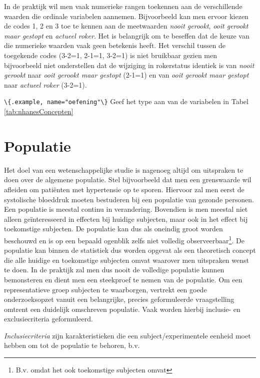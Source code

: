 \documentclass[
  12pt,dutch,coursenotes]{book}
\newcommand{\passthrough}[1]{#1}
\begin{document}
In de praktijk wil men vaak numerieke rangen toekennen aan de verschillende
waarden die ordinale variabelen aannemen. Bijvoorbeeld kan men ervoor kiezen
de codes 1, 2 en 3 toe te kennen aan de meetwaarden \emph{nooit gerookt}, \emph{ooit gerookt maar gestopt} en \emph{actueel roker}.
Het is belangrijk om te beseffen dat de keuze van die numerieke waarden vaak geen betekenis heeft.
Het verschil tussen de toegekende codes (3-2=1, 2-1=1, 3-2=1) is niet bruikbaar gezien men bijvoorbeeld niet onderstellen dat de wijziging in rokerstatus identiek is van \emph{nooit gerookt} naar \emph{ooit gerookt maar gestopt} (2-1=1) en van \emph{ooit gerookt maar gestopt} naar \emph{actueel roker} (3-2=1).

\passthrough{\lstinline!\{.example, name="oefening"\}!}
Geef het type aan van de variabelen in Tabel \ref{tab:nhanesConcepten}

\hypertarget{subsec:pop}{%
\section{Populatie}\label{subsec:pop}}

Het doel van een wetenschappelijke studie is nagenoeg altijd om uitspraken te doen over de algemene populatie.
Stel bijvoorbeeld dat men een grenswaarde wil afleiden om patiënten met hypertensie op te sporen.
Hiervoor zal men eerst de systolische bloeddruk moeten bestuderen bij een populatie van gezonde personen.
Een populatie is meestal continu in verandering.
Bovendien is men meestal niet alleen geïnteresseerd in effecten bij huidige subjecten, maar ook in het effect bij toekomstige subjecten.
De populatie kan dus als oneindig groot worden beschouwd en is op een bepaald ogenblik zelfs niet volledig observeerbaar\footnote{B.v. omdat het ook toekomstige subjecten omvat}.
De populatie kan binnen de statistiek dus worden opgevat als een theoretisch concept die alle huidige en toekomstige subjecten omvat waarover men uitspraken wenst te doen.
In de praktijk zal men dus nooit de volledige populatie kunnen bemonsteren en dient men een steekproef te nemen van de populatie.
Om een representatieve groep subjecten te waarborgen, vertrekt een goede onderzoeksopzet vanuit een belangrijke, precies geformuleerde vraagstelling
omtrent een duidelijk omschreven populatie.
Vaak worden hierbij inclusie- en exclusiecriteria geformuleerd.

\emph{Inclusiecriteria} zijn karakteristieken die een subject/experimentele eenheid moet hebben om tot de populatie te behoren, b.v.
\end{document}
